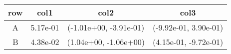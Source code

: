 \begin{tabular}{cccc}
\toprule
row&col1&col2&col3\tabularnewline
\midrule
A&5.17e-01& (-1.01e+00, -3.91e-01)& (-9.92e-01, 3.90e-01)\tabularnewline
B&4.38e-02& (1.04e+00, -1.06e+00)& (4.15e-01, -9.72e-01)\tabularnewline
\bottomrule
\end{tabular}
